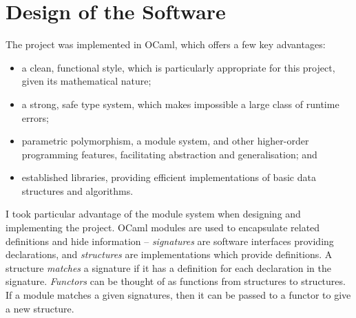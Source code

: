 \documentclass[12pt,a4paper,twoside,openright]{report}
\begin{document}
\section{Design of the Software}

The project was implemented in OCaml, which
offers a few key advantages:
\begin{itemize}
	\item a clean, functional
	style, which is particularly appropriate for
	this project, given its mathematical nature;
	\item a strong, safe type system, which makes
	impossible a large class of runtime errors;
	\item parametric polymorphism, a module system,
	and other higher-order programming features,
	facilitating abstraction and generalisation; and
	\item established libraries, providing efficient
	implementations of basic data structures and algorithms.
\end{itemize}
I took particular advantage of the module system when
designing and implementing the project. OCaml modules
are used to encapsulate related definitions and hide
information -- \emph{signatures} are software interfaces
providing declarations,
and \emph{structures} are implementations which 
provide definitions. A structure \emph{matches} a
signature if it has a definition for each declaration
in the signature. \emph{Functors} can be thought of
as functions from structures to structures. If a
module matches a given signatures, then it can be
passed to a functor to give a new structure.
\end{document}
